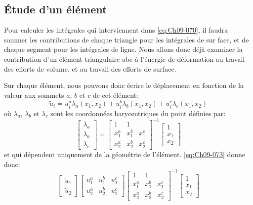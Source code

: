 \subsection{Étude d'un élément} \label{ssec:Ch09-3.3}
Pour calculer les intégrales qui interviennent dans \eqref{eq:Ch09-070}, il faudra sonnner les contributions de chaque triangle pour les intégrales de sur face, et de chaque segment pour les intégrales de ligne.
Nous allons donc déjà examiner la contribution d'un élément triangulaire abc à l'énergie de déformation au travail des efforts de volume, et au travail des efforts de surface. 

Sur chaque élément, nous pouvons donc écrire le déplacement en fonction de la valeur aux sommets $a$, $b$ et $c$ de cet élément: 
\begin{equation}
    \tilde{u}_i = u_i^a \lambda_a \left( x_1, x_2 \right) + u_i^b \lambda_b \left( x_1, x_2 \right) + u_i^c \lambda_c \left( x_1, x_2 \right)
    \label{eq:Ch09-073}
\end{equation}
où $\lambda_a$, $\lambda_b$ et $\lambda_c$ sont les coordonnées barycentriques du point définies par: 
\begin{equation}
    \begin{bmatrix}
        \lambda_a\\
        \lambda_b\\
        \lambda_c
    \end{bmatrix}
    =
    \begin{bmatrix}
        1 & 1 & \\
        x_1^a & x_1^b & x_1^c \\
        x_2^a & x_2^b & x_2^c
    \end{bmatrix}^{-1}
    \begin{bmatrix}
        1 \\
        x_1 \\
        x_2
    \end{bmatrix}
    \label{eq:Ch09-074}
\end{equation}
et qui dépendent uniquement de la géométrie de l'élément.
\eqref{eq:Ch09-073} donne donc:
\begin{equation}
    \begin{bmatrix}
        \tilde{u}_1 \\
        \tilde{u}_2
    \end{bmatrix}
    \begin{bmatrix}
        u_1^a & u_1^b & u_1^c \\
        u_2^a & u_2^b & u_2^c
    \end{bmatrix}
    \begin{bmatrix}
        1 & 1 & \\
        x_1^a & x_1^b & x_1^c \\
        x_2^a & x_2^b & x_2^c
    \end{bmatrix}^{-1}
    \begin{bmatrix}
        1 \\
        x_1 \\
        x_2
    \end{bmatrix}
    \label{eq:Ch09-075}
\end{equation}
